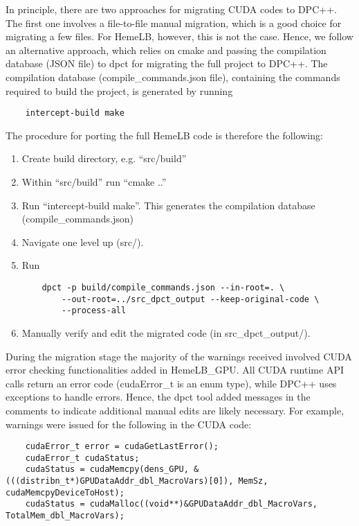 \documentclass[../main]{subfiles}
\begin{document}
In principle, there are two approaches for migrating CUDA codes to DPC++.
The first one involves a file-to-file manual migration, which is a good choice for migrating a few files.
For HemeLB, however, this is not the case.
Hence, we follow an alternative approach, which relies on cmake and passing the compilation database (JSON file) to dpct for migrating the full project to DPC++.
The compilation database (compile\_commands.json file), containing the commands required to build the project, is generated by running
\begin{verbatim}
    intercept-build make
\end{verbatim}

The procedure for porting the full HemeLB code is therefore the following:
\begin{enumerate}
	\item Create build directory, e.g. ``src/build''
	\item Within ``src/build'' run ``cmake ..'' %
	\item Run ``intercept-build make''. This generates the compilation database (compile\_commands.json)
	\item Navigate one level up (src/).
	\item Run
	      \begin{verbatim}
    dpct -p build/compile_commands.json --in-root=. \
        --out-root=../src_dpct_output --keep-original-code \
        --process-all
    \end{verbatim}
	\item Manually verify and edit the migrated code (in src\_dpct\_output/).
\end{enumerate}

During the migration stage the majority of the warnings received involved CUDA error checking functionalities added in HemeLB\_GPU.
All CUDA runtime API calls return an error code (cudaError\_t is an enum type), while DPC++ uses exceptions to handle errors.
Hence, the dpct tool added messages in the comments to indicate additional manual edits are likely necessary.
For example, warnings were issued for the following in the CUDA code:
\begin{verbatim}
    cudaError_t error = cudaGetLastError();
    cudaError_t cudaStatus;
    cudaStatus = cudaMemcpy(dens_GPU, &(((distribn_t*)GPUDataAddr_dbl_MacroVars)[0]), MemSz, cudaMemcpyDeviceToHost);
    cudaStatus = cudaMalloc((void**)&GPUDataAddr_dbl_MacroVars, TotalMem_dbl_MacroVars);
\end{verbatim}
\end{document}
